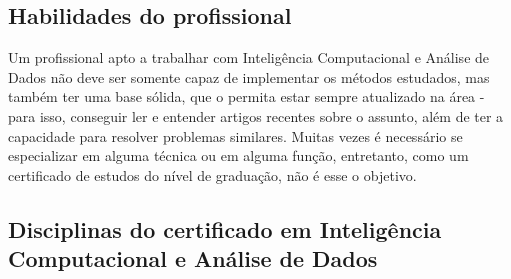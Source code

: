 \documentclass{article}
\begin{document}
	\subsection{Habilidades do profissional}
	Um profissional apto a trabalhar com Inteligência Computacional e Análise de Dados não deve ser somente capaz de implementar os métodos estudados, mas também ter uma base sólida, que o permita estar sempre atualizado na área - para isso, conseguir ler e entender artigos recentes sobre o assunto, além de ter a capacidade para resolver problemas similares. Muitas vezes é necessário se especializar em alguma técnica ou em alguma função, entretanto, como um certificado de estudos do nível de graduação, não é esse o objetivo.
	
	\subsection{Disciplinas do certificado em Inteligência Computacional e Análise de Dados} \label{sec:Disc}
	
\end{document}
